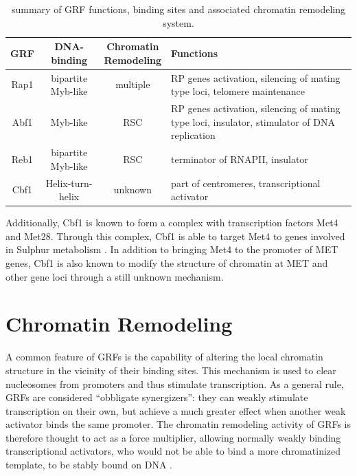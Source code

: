 \begin{table}
\begin{tabular}[c]{cccp{4.9cm}}
\hline 
GRF & DNA-binding & \makecell{Chromatin\\Remodeling}  & Functions  \\
\hline 
Rap1 & bipartite Myb-like & multiple \cite{reja:2015:molecular} & RP genes activation, silencing of mating type loci, telomere maintenance \vspace{2mm} \\ 
Abf1 & Myb-like & RSC & RP genes activation, silencing of mating type loci, insulator, stimulator of DNA replication \vspace{2mm} \\
Reb1 & bipartite Myb-like & RSC & terminator of RNAPII, insulator \vspace{2mm} \\ 
Cbf1 & Helix-turn-helix & unknown & part of centromeres, transcriptional activator \\ 
\hline 

\end{tabular} 
\caption[characteristics of GRFs]{summary of GRF functions, binding sites and associated chromatin remodeling system.}
\label{tab:grfs}
\end{table}

Additionally, Cbf1 is known to form a complex with transcription factors Met4 and Met28. 
Through this complex, Cbf1 is able to target Met4 to genes involved in Sulphur metabolism \cite{oconnell:1995:role}. 
In addition to bringing Met4 to the promoter of MET genes, Cbf1 is also known to modify the structure of chromatin at MET and other gene loci through a still unknown mechanism.


\section{Chromatin Remodeling} 

A common feature of GRFs is the capability of altering the local chromatin structure in the vicinity of their binding sites. This mechanism is used to clear nucleosomes from promoters and thus stimulate transcription. 
As a general rule, GRFs are considered “obbligate synergizers”: they can weakly stimulate transcription on their own, but achieve a much greater effect when another weak activator binds the same promoter. 
The chromatin remodeling activity of GRFs is therefore thought to act as a force multiplier, allowing normally weakly binding transcriptional activators, who would not be able to bind a more chromatinized template, to be stably bound on DNA \cite{chasman:1990:yeast,bussemaker:2001:regulatory,pilpel:2001:identifying}.


